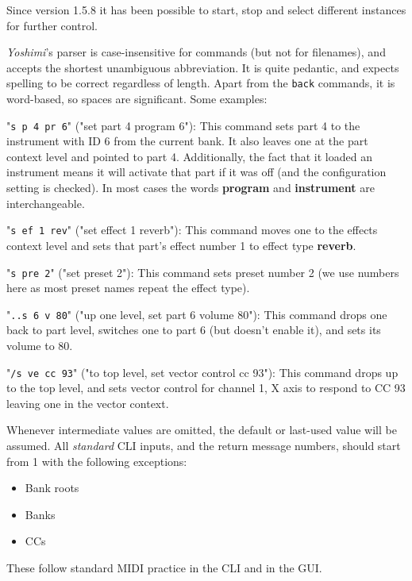 \documentclass[
 11pt,
 twoside,
 a4paper,
 final                                 %
]{article}
\begin{document}
   Since version 1.5.8 it has been possible to start, stop and select
   different instances for further control.

   \textsl{Yoshimi}'s parser is case-insensitive for commands (but not for
   filenames), and accepts the shortest unambiguous abbreviation. It is
   quite pedantic, and expects spelling to be correct regardless of length.
   Apart from the \texttt{back} commands, it is word-based, so spaces are
   significant.  Some examples:

   "\texttt{s p 4 pr 6}" ("set part 4 program 6"):
   This command sets part 4 to the instrument with ID 6 from the current bank.
   It also leaves one at the part context level and pointed to part 4.
   Additionally, the fact that it loaded an instrument means it will activate
   that part if it was off (and the configuration setting is checked). In most
   cases the words \textbf{program} and \textbf{instrument} are interchangeable.

   "\texttt{s ef 1 rev}" ("set effect 1 reverb"):
   This command moves one to the effects context level and sets that part's
   effect number 1 to effect type \textbf{reverb}.

   "\texttt{s pre 2}" ("set preset 2"):
   This command sets preset number 2 (we use numbers here as most preset names
   repeat the effect type).

   "\texttt{..s 6 v 80}" ("up one level, set part 6 volume 80"):
   This command drops one back to part level, switches one to part 6 (but doesn't
   enable it), and sets its volume to 80.

   "\texttt{/s ve cc 93}" ("to top level, set vector control cc 93"):
   This command drops up to the top level, and sets vector control for
   channel 1, X axis to respond to CC 93 leaving one in the vector context.

   Whenever intermediate values are omitted, the default or last-used value
   will be assumed.
   All \textsl{standard} CLI inputs, and the return message numbers,
   should start from 1 with the following exceptions:

    \begin{itemize}
       \item Bank roots
       \item Banks
       \item CCs
       \end{itemize}

   These follow standard MIDI practice in the CLI and in the GUI.
\end{document}

